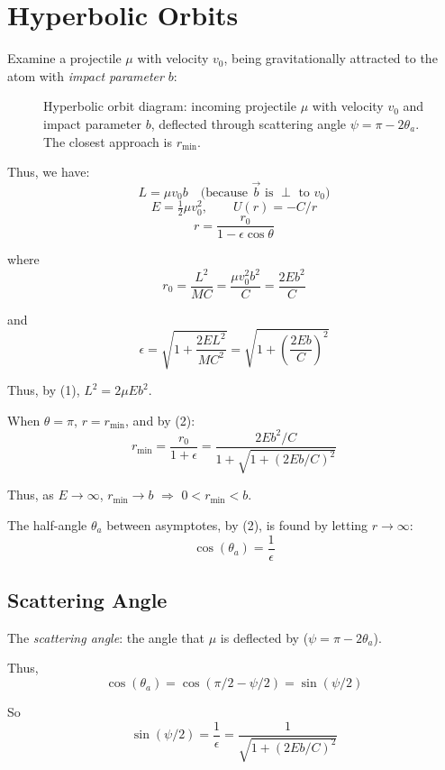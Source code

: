 \section{Hyperbolic Orbits}

Examine a projectile $\mu$ with velocity $v_0$, being gravitationally attracted to the atom with \emph{impact parameter} $b$:

\begin{figure}[H]
  \centering
  \caption{Hyperbolic orbit diagram: incoming projectile $\mu$ with velocity $v_0$ and impact parameter $b$, deflected through scattering angle $\psi = \pi - 2\theta_a$. The closest approach is $r_\text{min}$.}
\end{figure}

Thus, we have:
\[
  L = \mu v_0 b \quad \text{(because $\vec{b}$ is $\perp$ to $v_0$)}
\]
\[
  E = \tfrac{1}{2}\mu v_0^2, \qquad U(r) = -C/r
\]
\[
  r = \frac{r_0}{1 - \epsilon\cos\theta} \tag{2}
\]

where
\begin{equation}
  r_0 = \frac{L^2}{MC} = \frac{\mu v_0^2 b^2}{C} = \frac{2Eb^2}{C} \tag{1}
\end{equation}

and
\[
  \epsilon = \sqrt{1 + \frac{2EL^2}{MC^2}} = \sqrt{1 + \left(\frac{2Eb}{C}\right)^2}
\]

Thus, by (1), $L^2 = 2\mu E b^2$.

When $\theta = \pi$, $r = r_\text{min}$, and by (2):
\[
  r_\text{min} = \frac{r_0}{1+\epsilon} = \frac{2Eb^2/C}{1 + \sqrt{1+(2Eb/C)^2}}
\]

Thus, as $E \to \infty$, $r_\text{min} \to b$ $\Rightarrow$ $0 < r_\text{min} < b$.

The half-angle $\theta_a$ between asymptotes, by (2), is found by letting $r \to \infty$:
\begin{equation}
  \cos(\theta_a) = \frac{1}{\epsilon} \tag{3}
\end{equation}

\subsection{Scattering Angle}

The \emph{scattering angle}: the angle that $\mu$ is deflected by ($\psi = \pi - 2\theta_a$).

Thus,
\[
  \cos(\theta_a) = \cos(\pi/2 - \psi/2) = \sin(\psi/2)
\]

So
\[
  \sin(\psi/2) = \frac{1}{\epsilon} = \frac{1}{\sqrt{1 + (2Eb/C)^2}}
\]

